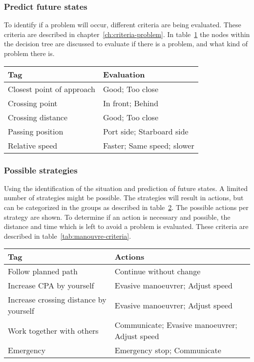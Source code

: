 \subsubsection{Predict future states}
To identify if a problem will occur, different criteria are being evaluated. These criteria are described in chapter~\ref{ch:criteria-problem}. In table~\ref{tab:identification-criteria} the nodes within the decision tree are discussed to evaluate if there is a problem, and what kind of problem there is. 
\begin{table}[H]
	\begin{tabular}{p{}|p{}}
		\toprule
		Tag & Evaluation \\
		\midrule
		Closest point of approach & Good; Too close \\
		Crossing point & In front; Behind \\
		Crossing distance & Good; Too close \\
		Passing position & Port side; Starboard side \\
		Relative speed & Faster; Same speed; slower \\
		\bottomrule
	\end{tabular}
	
	\label{tab:identification-criteria}
\end{table}

\subsubsection{Possible strategies}
Using the identification of the situation and prediction of future states. A limited number of strategies might be possible. The strategies will result in actions, but can be categorized in the groups as described in table~\ref{tab:strategies}. The possible actions per strategy are shown. To determine if an action is necessary and possible, the distance and time which is left to avoid a problem is evaluated. These criteria are described in table~\ref{tab:manouvre-criteria}.
\begin{table}[H]
	\begin{tabular}{p{}|p{}}
		\toprule
		Tag & Actions \\
		\midrule
		Follow planned path & Continue without change\\
		Increase CPA by yourself & Evasive manoeuvrer; Adjust speed \\
		Increase crossing distance by yourself & Evasive manoeuvrer; Adjust speed \\
		Work together with others & Communicate; Evasive manoeuvrer; Adjust speed \\
		Emergency & Emergency stop; Communicate \\
		\bottomrule
	\end{tabular}
	
	\label{tab:strategies}
\end{table}

